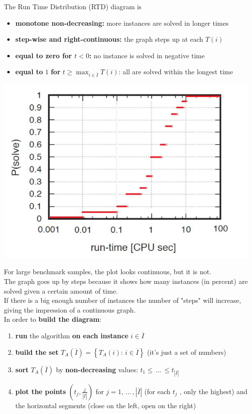 The Run Time Distribution (RTD) diagram is
\begin{itemize}
	\item \textbf{monotone non-decreasing:} more instances are solved in longer times
	\item \textbf{step-wise and right-continuous:} the graph steps up at each $T (i )$
	\item \textbf{equal to zero for $t < 0$:} no instance is solved in negative time
	\item \textbf{equal to} $1$ \textbf{for} $t \geq \max_{i \in \overline{I}} T(i)$: all are solved within the longest time
\end{itemize}
\begin{center}
	\includegraphics[width=0.75\columnwidth]{img/RTD2}
\end{center}
For large benchmark samples, the plot looks continuous, but it is not.\\

The graph goes up by steps because it shows how many instances (in percent) are solved given a certain amount of time. \\
If there is a big enough number of instances the number of "steps" will increase, giving the impression of a continuous graph.\\

In order to \textbf{build the diagram}:
\begin{enumerate}
	\item \textbf{run} the algorithm \textbf{on each instance} $i \in \overline{I}$
	\item \textbf{build the set} $T_A (\overline{I}) = \left\{T_A (i): \, i \in \overline{I}\right\}$ (it's just a set of numbers)
	\item \textbf{sort} $T_A (\overline{I})$ by \textbf{non-decreasing} values: $t_1 \leq \, ... \, \leq  t_{|\overline{I}|}$
	\item \textbf{plot the points} $\left(t_j, \frac{j}{|\overline{I}|}\right)$ for $j = 1, \, ... \, , |\overline{I}|$ (for each $t_j$ , only the highest) and the horizontal segments (close on the left, open on the right)
\end{enumerate}

